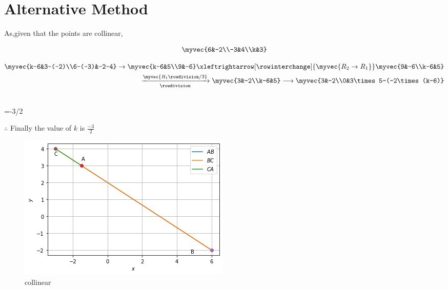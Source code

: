 \documentclass[journal,12pt,twocolumn]{IEEEtran}
\begin{document}
\section{Alternative Method}
As,given that the points are collinear,

\begin{align}
\myvec{6&-2\\-3&4\\k&3}
\end{align}

\begin{align}
\myvec{k-6&3-(-2)\\6-(-3)&-2-4}
\rightarrow
\myvec{k-6&5\\9&-6}
\xleftrightarrow[\rowinterchange]{\myvec{R_2\rightarrow R_1}}
\myvec{9&-6\\k-6&5}\\
\xrightarrow[\rowdivision]{\myvec{R_1\rowdivision/3}}
\myvec{3&-2\\k-6&5}
\longrightarrow
\myvec{3&-2\\0&3\times5-(-2\times(k-6)}\\
\end{align}


\\ 
={-3/2}

 $\therefore$ Finally the value of $k$ is $\frac{-3}{2}$
 
 \begin{figure}[h!]
\includegraphics[width=\linewidth]{Collinear.png}
  \caption{collinear}
  \label{collinear points}
\end{figure}
\end{document}
